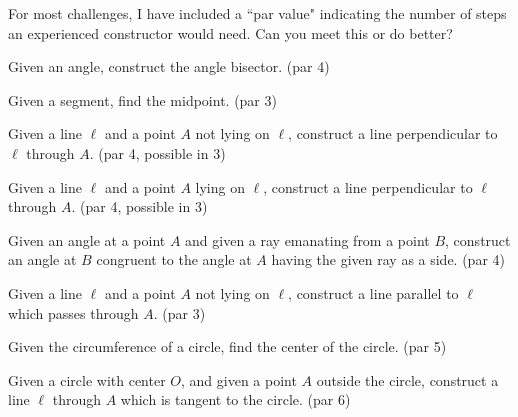 For most challenges, I have included a ``par value" indicating the number of steps an experienced constructor would need.
Can you meet this or do better?


\begin{challenge}\label{chal:angle-bisector}
Given an angle, construct the angle bisector. (par 4)
\end{challenge}

\begin{challenge}\label{chal:midpoint}
Given a segment, find the midpoint. (par 3)
\end{challenge}

\begin{challenge}\label{chal:perp-pt-not-on-line}
Given a line $\ell$ and a point $A$ not lying on $\ell$, construct a line perpendicular to $\ell$ through $A$. (par 4, possible in 3)
\end{challenge}

\begin{challenge}\label{chal:perp-pt-on-line}
Given a line $\ell$ and a point $A$ lying on $\ell$, construct a line perpendicular to $\ell$ through $A$. (par 4, possible in 3)
\end{challenge}

\begin{challenge}\label{chal:copy-angle}
Given an angle at a point $A$ and given a ray emanating from a point $B$, construct an angle at $B$ congruent to the angle at $A$ having the given ray as a side. (par 4)
\end{challenge}

\begin{challenge}\label{chal:parallel}
Given a line $\ell$ and a point $A$ not lying on $\ell$, construct a line parallel to $\ell$ which passes through $A$. (par 3)
\end{challenge}

\begin{challenge}\label{chal:circle-center}
Given the circumference of a circle, find the center of the circle. (par 5)
\end{challenge}

\begin{challenge}\label{chal:tangent-circle-point}
Given a circle with center $O$, and given a point $A$ outside the circle, construct a line $\ell$ through $A$ which is tangent to the circle. (par 6)
\end{challenge}



